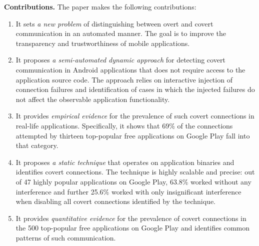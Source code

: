 
\noindent 
{\bf Contributions.}
The paper makes the following contributions:

\vspace{-0.05in}
\begin{enumerate}[leftmargin=0.5cm]\setlength{\itemsep}{-0.01in}

\item It sets \emph{a new problem} of distinguishing between overt and covert communication in an automated manner. 
The goal is to improve the
transparency and trustworthiness of mobile applications.


\item It proposes \emph{a semi-automated dynamic approach} for detecting covert communication in Android applications that does not require access to the application source code. 
The approach relies on interactive injection of connection failures
and identification of cases in which the injected failures do not
affect the observable application functionality.

\item It provides \emph{empirical evidence} for the prevalence of such covert connections in real-life applications. Specifically, it shows that 69\% of the connections attempted by thirteen top-popular free applications on Google Play fall into that category.    

\item It proposes \emph{a static technique} that operates on
application binaries and identifies covert connections. 
The
technique is highly scalable and precise: out of 47 highly popular
applications on Google Play, 63.8\% worked without any interference
and further 25.6\% worked with only insignificant interference when
disabling all covert connections identified by the technique.


\item It provides \emph{quantitative evidence} for the prevalence of covert connections in the 500 top-popular free applications on Google Play and identifies common patterns of such communication. 


\end{enumerate}


